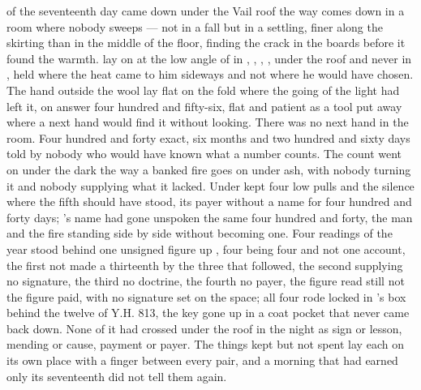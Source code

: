
 of the seventeenth day came down under the Vail roof the way  comes down in a room where nobody sweeps --- not in a fall but in a settling, finer along the skirting than in the middle of the floor, finding the crack in the boards before it found the warmth.  lay on  at the low angle of  in , , , , under the roof and never in , held where the heat came to him sideways and not where he would have chosen. The hand outside the wool lay flat on the fold where the going of the light had left it, on answer four hundred and fifty-six, flat and patient as a tool put away where a next hand would find it without looking. There was no next hand in the room. Four hundred and forty exact, six months and two hundred and sixty days told by nobody who would have known what a number counts. The count went on under the dark the way a banked fire goes on under ash, with nobody turning it and nobody supplying what it lacked. Under   kept four low pulls and the silence where the fifth should have stood, its payer without a name for four hundred and forty days; 's name had gone unspoken the same four hundred and forty, the man and the fire standing side by side without becoming one. Four readings of the year stood behind one unsigned figure up , four being four and not one account, the first not made a thirteenth by the three that followed, the second supplying no signature, the third no doctrine, the fourth no payer, the figure read still not the figure paid, with no signature set on the space; all four rode locked in 's box behind the twelve of Y.H. 813, the key gone up in a coat pocket that never came back down. None of it had crossed under the roof in the night as sign or lesson, mending or cause, payment or payer. The things kept but not spent lay each on its own place with a finger between every pair, and a morning that had earned only its seventeenth did not tell them again.

